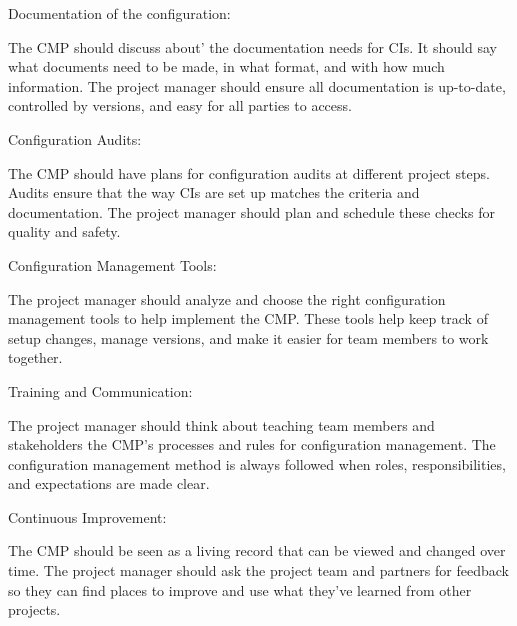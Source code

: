 Documentation of the configuration: 

The CMP should discuss about’ the documentation needs for CIs. It should say what documents need to be made, in what format, and with how much information. The project manager should ensure all documentation is up-to-date, controlled by versions, and easy for all parties to access.

Configuration Audits: 

The CMP should have plans for configuration audits at different project steps. Audits ensure that the way CIs are set up matches the criteria and documentation. The project manager should plan and schedule these checks for quality and safety.

Configuration Management Tools: 

The project manager should analyze and choose the right configuration management tools to help implement the CMP. These tools help keep track of setup changes, manage versions, and make it easier for team members to work together.

Training and Communication: 

The project manager should think about teaching team members and stakeholders the CMP’s processes and rules for configuration management. The configuration management method is always followed when roles, responsibilities, and expectations are made clear.

Continuous Improvement: 

The CMP should be seen as a living record that can be viewed and changed over time. The project manager should ask the project team and partners for feedback so they can find places to improve and use what they’ve learned from other projects.
